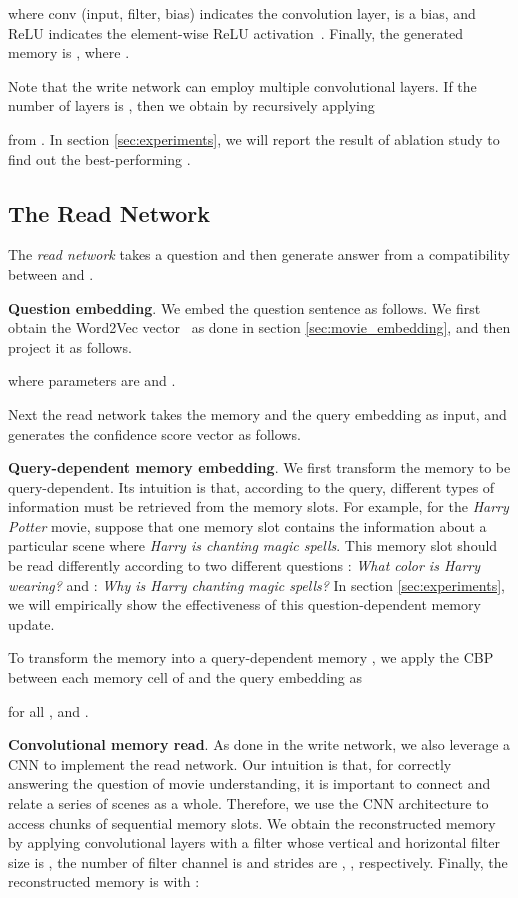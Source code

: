 \documentclass[10pt,twocolumn,letterpaper]{article}
\theoremstyle{nonumberplain}
\begin{document}
\noindent where conv (input, filter, bias) indicates the convolution layer,  is a bias, and ReLU indicates the element-wise ReLU activation~\cite{nair2010rectified}. 
Finally, the generated memory is , where . 

Note that the write network can employ multiple convolutional layers. If the number of layers is , then we obtain  by recursively applying 

\noindent from .
In section \ref{sec:experiments}, we will report the result of ablation study to find out the best-performing . 


\subsection{The Read Network}
\label{sec:read_net}

The \textit{read network} takes a question  and then generate answer from a compatibility between  and .

\smallskip
\textbf{Question embedding}. 
We embed the question sentence  as follows. 
We first obtain the Word2Vec vector~\cite{mikolov2013distributed}  as done in section \ref{sec:movie_embedding}, and then project it as follows.

\noindent where parameters are  and .

Next the read network takes the memory  and the query embedding  as input, and generates the confidence score vector 
as follows. 


\smallskip
\textbf{Query-dependent memory embedding}.
We first transform the memory  to be query-dependent. 
Its intuition is that, according to the query, different types of information must be retrieved from the memory slots. 
For example, for the \textit{Harry Potter} movie, suppose that one memory slot contains the information about a particular scene where \textit{Harry is chanting magic spells}.
This memory slot should be read differently according to two different questions : \textit{What color is Harry wearing?} and : \textit{Why is Harry chanting magic spells?}
In section \ref{sec:experiments}, we will empirically show the effectiveness of this question-dependent memory update.

To transform the memory  into a query-dependent memory , 
we apply the CBP~\cite{fukui2016multimodal} between each memory cell of  and the query embedding  as

\noindent for all , and .



\smallskip
\textbf{Convolutional memory read}.
As done in the write network, we also leverage a CNN to implement the read network. 
Our intuition is that, for correctly answering the question of movie understanding, it is important to connect and relate a series of scenes as a whole. 
Therefore, we use the CNN architecture to access chunks of sequential memory slots. We obtain the reconstructed memory  by applying convolutional layers with a filter  
whose vertical and horizontal filter size is , the number of filter channel is  and strides are , , respectively.
Finally, the reconstructed memory is  with  :
\end{document}
